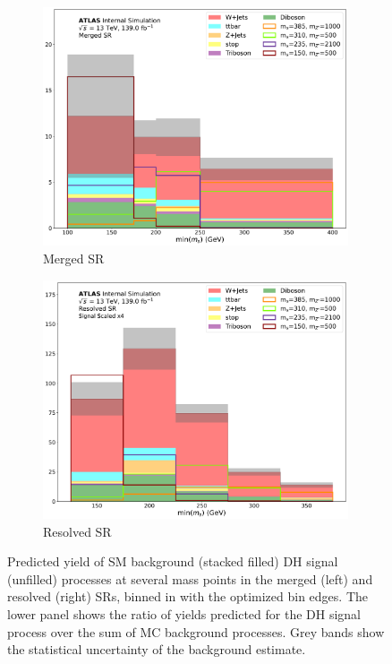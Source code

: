 \begin{figure}[htbp]
  \centering
    \begin{subfigure}[t]{0.48\textwidth}
    \centering
     \includegraphics[width = 0.99\textwidth]{Figures/7/SR1L_Merged_fit/TARJets10_minmS_mgd.pdf}
    \caption{Merged SR}
    \end{subfigure}
    \begin{subfigure}[t]{0.48\textwidth}
    \centering
     \includegraphics[width = 0.99\textwidth]{Figures/7/SR1L_Resolved_fit/TARJets10_minmS_res.pdf}
     \caption{Resolved SR}
    \end{subfigure}
    \caption{Predicted yield of SM background (stacked filled) DH signal (unfilled) processes at several mass points in the merged (left) and resolved (right) SRs, binned in \minms with the optimized bin edges. The lower panel shows the ratio of yields predicted for the DH signal process over the sum of MC background processes. Grey bands show the statistical uncertainty of the background estimate.}
   \label{fig:minms_binning}
\end{figure}

